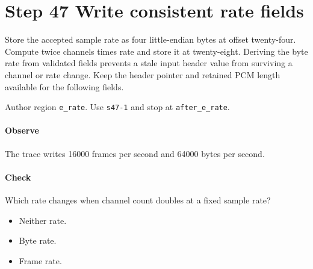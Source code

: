 \section{Step 47 Write consistent rate fields}\label{pcm-wav-s47}
Store the accepted sample rate as four little-endian bytes at offset twenty-four. Compute twice channels times rate and store it at twenty-eight. Deriving the byte rate from validated fields prevents a stale input header value from surviving a channel or rate change. Keep the header pointer and retained PCM length available for the following fields.

Author region \texttt{e\_rate}. Use \texttt{s47-1} and stop at \texttt{after\_e\_rate}.

\paragraph{Observe} The trace writes 16000 frames per second and 64000 bytes per second.

\paragraph{Check} Which rate changes when channel count doubles at a fixed sample rate?
\begin{itemize}
  \item[A.] Neither rate.
  \item[B.] Byte rate.
  \item[C.] Frame rate.
\end{itemize}
